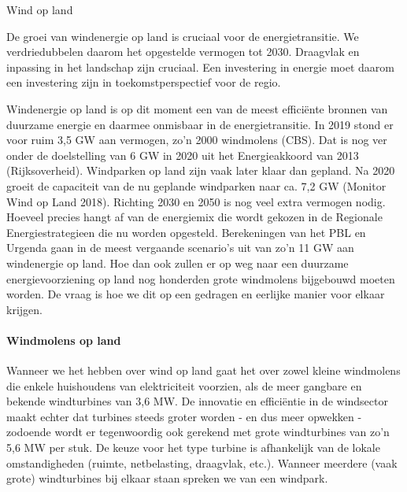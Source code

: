 \begin{voorstel}{Wind op land}

\begin{samenvatting}
De groei van windenergie op land is cruciaal voor de energietransitie. We verdriedubbelen daarom het opgestelde vermogen tot 2030. Draagvlak en inpassing in het landschap zijn cruciaal. Een investering in energie moet daarom een investering zijn in toekomstperspectief voor de regio.
\end{samenvatting}

\begin{uitdaging}
Windenergie op land is op dit moment een van de meest efficiënte bronnen van duurzame energie en daarmee onmisbaar in de energietransitie. In 2019 stond er voor ruim 3,5 GW aan vermogen, zo’n 2000 windmolens (CBS). Dat is nog ver onder de doelstelling van 6 GW in 2020 uit het Energieakkoord van 2013 (Rijksoverheid). Windparken op land zijn vaak later klaar dan gepland. Na 2020 groeit de capaciteit van de nu geplande windparken naar ca. 7,2 GW (Monitor Wind op Land 2018). Richting 2030 en 2050 is nog veel extra vermogen nodig. Hoeveel precies hangt af van de energiemix die wordt gekozen in de Regionale Energiestrategieen die nu worden opgesteld. Berekeningen van het PBL en Urgenda gaan in de meest vergaande scenario’s uit van zo’n 11 GW aan windenergie op land. Hoe dan ook zullen er op weg naar een duurzame energievoorziening op land nog honderden grote windmolens bijgebouwd moeten worden. De vraag is hoe we dit op een gedragen en eerlijke manier voor elkaar krijgen.
\end{uitdaging}

\begin{overwegingen}
\paragraph{Windmolens op land}
Wanneer we het hebben over wind op land gaat het over zowel kleine windmolens die enkele huishoudens van elektriciteit voorzien, als de meer gangbare en bekende windturbines van 3,6 MW. De innovatie en efficiëntie in de windsector maakt echter dat turbines steeds groter worden - en dus meer opwekken - zodoende wordt er tegenwoordig ook gerekend met grote windturbines van zo’n 5,6 MW per stuk. De keuze voor het type turbine is afhankelijk van de lokale omstandigheden (ruimte, netbelasting, draagvlak, etc.).  Wanneer meerdere (vaak grote) windturbines bij elkaar staan spreken we van een windpark.


\end{overwegingen}
\end{voorstel}
